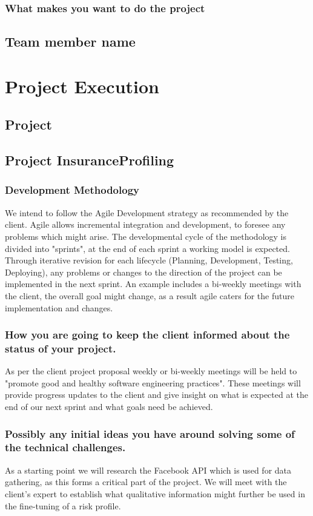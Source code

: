 \documentclass{article}
\begin{document}
	\subsubsection{What makes you want to do the project}

	\subsection{Team member name}
	
	\section{Project Execution}
	\subsection{Project }
	\subsection{Project InsuranceProfiling}
	\subsubsection{Development Methodology}
	We intend to follow the Agile Development strategy as recommended by the client. Agile allows incremental integration and development, to foresee any problems which might arise. The developmental cycle of the methodology is divided into "sprints", at the end of each sprint a working model is expected. Through iterative revision for each lifecycle (Planning, Development, Testing, Deploying), any problems or changes to the direction of the project can be implemented in the next sprint. An example includes a bi-weekly meetings with the client, the overall goal might change, as a result agile caters for the future implementation and changes.
	
	\subsubsection{How you are going to keep the client informed about the status of your project.}
	As per the client project proposal weekly or bi-weekly meetings will be held to "promote good and
healthy software engineering practices". These meetings will provide progress updates to the client and give insight on what is expected at the end of our next sprint and what goals need be achieved. 
	
	\subsubsection{Possibly any initial ideas you have around solving some of the technical challenges.}
	As a starting point we will research the Facebook API which is used for data gathering, as this forms a critical part of the project. We will meet with the client's expert to establish what qualitative information might further be used in the fine-tuning of a risk profile.
	
\end{document}
